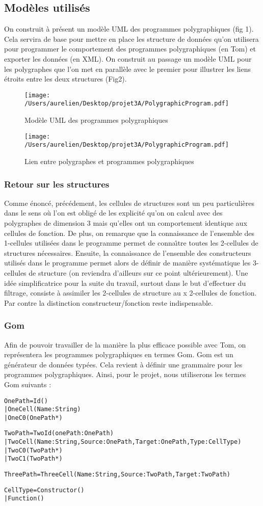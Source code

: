 \documentclass[a4paper,11pt,titlepage]{article}
\newcommand\insModele[2]{\texttt{[image: /Users/aurelien/Desktop/projet3A/PolygraphicProgram.pdf]}}
\begin{document}
\subsection{Mod\`{e}les utilis\'{e}s}
On construit \`{a} pr\'{e}sent un mod\`{e}le UML des programmes polygraphiques (fig 1). Cela servira de base pour mettre en place les structure de donn\'{e}es qu'on utilisera pour programmer le comportement des programmes polygraphiques (en Tom) et exporter les donn\'{e}es (en XML). On construit au passage un mod\`{e}le UML pour les polygraphes que l'on met en parall\`{e}le avec le premier pour illustrer les liens \'{e}troits entre les deux structures (Fig2).
\begin{figure}\insModele{3}{-90}\caption{Mod\`{e}le UML des programmes polygraphiques}\end{figure}
\begin{figure}\insModele{4}{-90}\caption{Lien entre polygraphes et programmes polygraphiques}\end{figure}
\subsubsection{Retour sur les structures}Comme \'{e}nonc\'{e}, pr\'{e}c\'{e}dement, les cellules de structures sont un peu particuli\`{e}res dans le sens o\`{u} l'on est oblig\'{e} de les explicit\'{e} qu'on on calcul avec des polygraphes de dimension 3 mais qu'elles ont un comportement identique aux cellules de fonction. De plus, on remarque que la connaissance de l'ensemble des 1-cellules utilis\'{e}es dans le programme permet de conna\^{\i}tre toutes les 2-cellules de structures n\'{e}cessaires. Ensuite, la connaissance de l'ensemble des constructeurs utilis\'{e}s dans le programme permet alors de d\'{e}finir de mani\`{e}re syst\'{e}matique les 3-cellules de structure (on reviendra d'ailleurs sur ce point ult\'{e}rieurement). Une id\'{e}e simplificatrice pour la suite du travail, surtout dans le but d'effectuer du filtrage, consiste \`{a} assimiler les 2-cellules de structure au x 2-cellules de fonction. Par contre la distinction constructeur/fonction reste indispensable.
\subsubsection{Gom}
Afin de pouvoir travailler de la mani\`{e}re la plus efficace possible avec Tom, on repr\'{e}sentera les programmes polygraphiques en termes Gom. Gom est un g\'{e}n\'{e}rateur de donn\'{e}es typ\'{e}es. Cela revient \`{a} d\'{e}finir une grammaire pour les programmes polygraphiques. Ainsi, pour le projet, nous utiliserons les termes Gom suivants : 
\begin{alltt}
OnePath = Id()
   | OneCell (Name:String)
   | OneC0 (OnePath*)
	
TwoPath = TwoId (onePath:OnePath)
   | TwoCell (Name:String,Source:OnePath,Target:OnePath,Type:CellType)
   | TwoC0 (TwoPath*)
   | TwoC1 (TwoPath*)

ThreePath = ThreeCell (Name:String,Source:TwoPath,Target:TwoPath)

CellType = Constructor()
   | Function()
\end{alltt}
\end{document}
